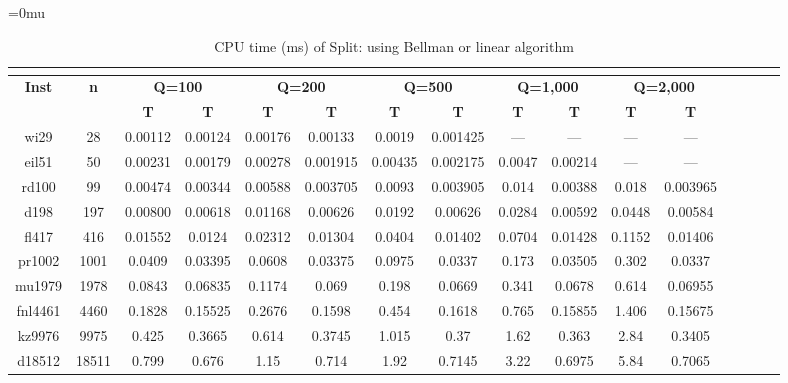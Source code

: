 \documentclass[11pt]{article}
\newcommand{\setmuskip}[2]{#1=#2\relax}
\begin{document}
\begin{table}[p]
\begingroup
\setmuskip{\medmuskip}{0mu}
\renewcommand{\arraystretch}{1.1}
\caption{CPU time (ms) of Split: using Bellman or linear algorithm} \label{Table-Linear}
\hspace*{-1.45cm}
\scalebox{0.77}
{
\setlength{\tabcolsep}{1.6mm}
\begin{tabular}{|cc|cc|cc|cc|cc|cc|cc|cc}
\multicolumn{12}{c}{\vspace*{-0.5cm}}\\
\hline
\multirow{2}{*}{\textbf{Inst}}&\multirow{2}{*}{\textbf{n}}&\multicolumn{2}{c|}{\textbf{Q=100}}&\multicolumn{2}{c|}{\textbf{Q=200}}&\multicolumn{2}{c|}{\textbf{Q=500}}&\multicolumn{2}{c|}{\textbf{Q=1,000}}&\multicolumn{2}{c|}{\textbf{Q=2,000}}\\
&&\textbf{T}&\textbf{T}&\textbf{T}&\textbf{T}&\textbf{T}&\textbf{T}&\textbf{T}&\textbf{T}&\textbf{T}&\textbf{T}\\
\hline
wi29&28&\num{0.00112}&\num{0.00124}&\num{0.00176}&\num{0.00133}&\num{0.0019}&\num{0.001425}&---&---&---&---\\
eil51&50&\num{0.00231}&\num{0.00179}&\num{0.00278}&\num{0.001915}&\num{0.00435}&\num{0.002175}&\num{0.0047}&\num{0.00214}&---&---\\
rd100&99&\num{0.00474}&\num{0.00344}&\num{0.00588}&\num{0.003705}&\num{0.0093}&\num{0.003905}&\num{0.014}&\num{0.00388}&\num{0.018}&\num{0.003965}\\
d198&197&\num{0.00800}&\num{0.00618}&\num{0.01168}&\num{0.00626}&\num{0.0192}&\num{0.00626}&\num{0.0284}&\num{0.00592}&\num{0.0448}&\num{0.00584}\\
fl417&416&\num{0.01552}&\num{0.0124}&\num{0.02312}&\num{0.01304}&\num{0.0404}&\num{0.01402}&\num{0.0704}&\num{0.01428}&\num{0.1152}&\num{0.01406}\\
pr1002&1001&\num{0.0409}&\num{0.03395}&\num{0.0608}&\num{0.03375}&\num{0.0975}&\num{0.0337}&\num{0.173}&\num{0.03505}&\num{0.302}&\num{0.0337}\\
mu1979&1978&\num{0.0843}&\num{0.06835}&\num{0.1174}&\num{0.069}&\num{0.198}&\num{0.0669}&\num{0.341}&\num{0.0678}&\num{0.614}&\num{0.06955}\\
fnl4461&4460&\num{0.1828}&\num{0.15525}&\num{0.2676}&\num{0.1598}&\num{0.454}&\num{0.1618}&\num{0.765}&\num{0.15855}&\num{1.406}&\num{0.15675}\\
kz9976&9975&\num{0.425}&\num{0.3665}&\num{0.614}&\num{0.3745}&\num{1.015}&\num{0.37}&\num{1.62}&\num{0.363}&\num{2.84}&\num{0.3405}\\
d18512&18511&\num{0.799}&\num{0.676}&\num{1.15}&\num{0.714}&\num{1.92}&\num{0.7145}&\num{3.22}&\num{0.6975}&\num{5.84}&\num{0.7065}\\

\end{tabular}}
\end{table}
\end{document}

